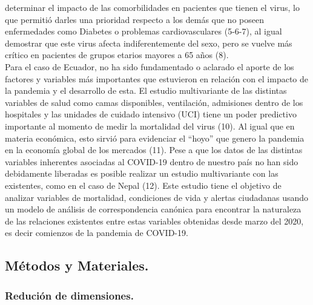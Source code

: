 determinar el impacto de las comorbilidades en pacientes que tienen el
virus, lo que permitió darles una prioridad respecto a los demás que no
poseen enfermedades como Diabetes o problemas cardiovasculares (5-6-7),
al igual demostrar que este virus afecta indiferentemente del sexo, pero
se vuelve más crítico en pacientes de grupos etarios mayores a 65 años
(8).\\
Para el caso de Ecuador, no ha sido fundamentado o aclarado el aporte de
los factores y variables más importantes que estuvieron en relación con
el impacto de la pandemia y el desarrollo de esta. El estudio
multivariante de las distintas variables de salud como camas
disponibles, ventilación, admisiones dentro de los hospitales y las
unidades de cuidado intensivo (UCI) tiene un poder predictivo importante
al momento de medir la mortalidad del virus (10). Al igual que en
materia económica, esto sirvió para evidenciar el ``hoyo'' que genero la
pandemia en la economía global de los mercados (11). Pese a que los
datos de las distintas variables inherentes asociadas al COVID-19 dentro
de nuestro país no han sido debidamente liberadas es posible realizar un
estudio multivariante con las existentes, como en el caso de Nepal (12).
Este estudio tiene el objetivo de analizar variables de mortalidad,
condiciones de vida y alertas ciudadanas usando un modelo de análisis de
correspondencia canónica para encontrar la naturaleza de las relaciones
existentes entre estas variables obtenidas desde marzo del 2020, es
decir comienzos de la pandemia de COVID-19.

\hypertarget{muxe9todos-y-materiales.}{%
\subsection{Métodos y Materiales.}\label{muxe9todos-y-materiales.}}

\hypertarget{reduciuxf3n-de-dimensiones.}{%
\subsubsection{Redución de
dimensiones.}\label{reduciuxf3n-de-dimensiones.}}

